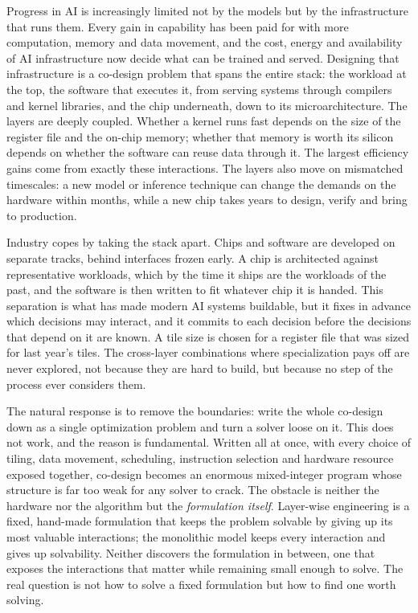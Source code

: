 \documentclass[11pt]{article}
\begin{document}
Progress in AI is increasingly limited not by the models but by the infrastructure that runs them. Every gain in capability has been paid for with more computation, memory and data movement, and the cost, energy and availability of AI infrastructure now decide what can be trained and served. Designing that infrastructure is a co-design problem that spans the entire stack: the workload at the top, the software that executes it, from serving systems through compilers and kernel libraries, and the chip underneath, down to its microarchitecture. The layers are deeply coupled. Whether a kernel runs fast depends on the size of the register file and the on-chip memory; whether that memory is worth its silicon depends on whether the software can reuse data through it. The largest efficiency gains come from exactly these interactions. The layers also move on mismatched timescales: a new model or inference technique can change the demands on the hardware within months, while a new chip takes years to design, verify and bring to production.

Industry copes by taking the stack apart. Chips and software are developed on separate tracks, behind interfaces frozen early. A chip is architected against representative workloads, which by the time it ships are the workloads of the past, and the software is then written to fit whatever chip it is handed. This separation is what has made modern AI systems buildable, but it fixes in advance which decisions may interact, and it commits to each decision before the decisions that depend on it are known. A tile size is chosen for a register file that was sized for last year's tiles. The cross-layer combinations where specialization pays off are never explored, not because they are hard to build, but because no step of the process ever considers them.

The natural response is to remove the boundaries: write the whole co-design down as a single optimization problem and turn a solver loose on it. This does not work, and the reason is fundamental. Written all at once, with every choice of tiling, data movement, scheduling, instruction selection and hardware resource exposed together, co-design becomes an enormous mixed-integer program whose structure is far too weak for any solver to crack. The obstacle is neither the hardware nor the algorithm but the \emph{formulation itself}. Layer-wise engineering is a fixed, hand-made formulation that keeps the problem solvable by giving up its most valuable interactions; the monolithic model keeps every interaction and gives up solvability. Neither discovers the formulation in between, one that exposes the interactions that matter while remaining small enough to solve. The real question is not how to solve a fixed formulation but how to find one worth solving.
\end{document}
